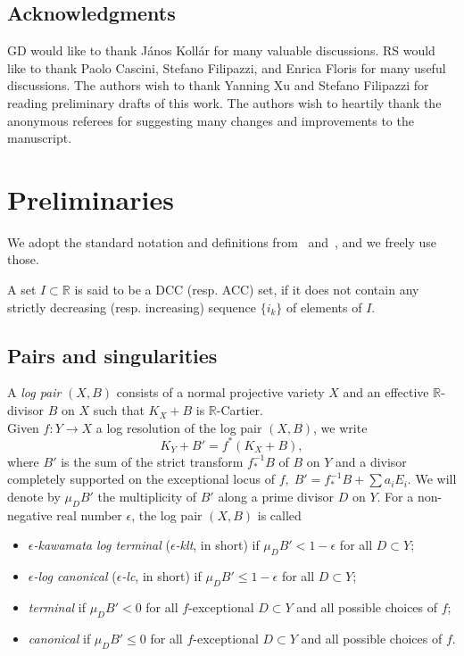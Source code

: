 \documentclass[11pt]{ip-journal}
\theoremstyle{definition}
\newcommand{\bR}{\mathbb{R}}
\begin{document}
\subsection*{Acknowledgments} 
GD would like to thank J\'anos Koll\'ar for many valuable discussions.
RS would like to thank Paolo Cascini, Stefano Filipazzi, and Enrica Floris for many useful discussions.
The authors wish to thank Yanning Xu and Stefano Filipazzi for reading preliminary drafts of this work.
The authors wish to heartily thank the anonymous referees for suggesting many changes and improvements to the manuscript.


\section{Preliminaries}
We adopt the standard notation and definitions from~\cite{KMM} and~\cite{KM}, and we freely use those.

A set $I \subset \bR$ is said to be a DCC (resp. ACC) set, if it does not contain any strictly decreasing (resp. increasing) sequence $\{i_k\}$ of elements of $I$.


\subsection{Pairs and singularities}\label{pair.sings.sect}
A {\it log pair} $(X, B)$ consists of a normal projective variety $X$ and an effective $\bR$-divisor $B$ on $X$ such that $K_X+B$ is $\bR$-Cartier.
\\
Given $f\colon Y\rightarrow X$ a log resolution of the log pair $(X, B)$, we write
\[
K_Y +B' =f^*(K_X+B),
\]
where $B'$ is the sum of the strict transform $f^{-1}_\ast B$ of $B$ on $Y$ and a divisor completely supported on the exceptional locus of $f, \; B'= f^{-1}_\ast B + \sum a_i E_i$.  
We will denote by $\mu_D B'$ the multiplicity of $B'$ along a prime divisor $D$ on $Y$.
For a non-negative real number $\epsilon$, the log pair $(X,B)$ is called
\begin{itemize}
\item[(a)] \emph{$\epsilon$-kawamata log terminal} (\emph{$\epsilon$-klt}, in short) if $\mu_D B'< 1-\epsilon$ for all $D \subset Y$;
\item[(b)] \emph{$\epsilon$-log canonical} (\emph{$\epsilon$-lc}, in short) if $\mu_D B'\leq  1-\epsilon$ for all $D \subset Y$;
\item[(c)] \emph{terminal} if  $\mu_D B'< 0$ for all $f$-exceptional $D \subset Y$ and all possible choices of $f$;
\item[(d)] \emph{canonical} if  $\mu_D B'\leq 0$ for all $f$-exceptional $D \subset Y$ and all possible choices of $f$.
\end{itemize}
\end{document}
